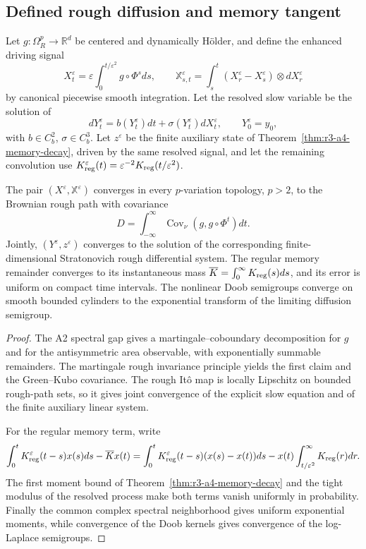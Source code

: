 \subsection{Defined rough diffusion and memory tangent}

Let \(g:\Omega_R^p\to\mathbb R^d\) be centered and dynamically H\"older, and
define the enhanced driving signal
\[
 X_t^\varepsilon
 =\varepsilon\int_0^{t/\varepsilon^2}g\circ\Phi^sds,
 \qquad
 \mathbb X_{s,t}^\varepsilon
 =\int_s^t(X_r^\varepsilon-X_s^\varepsilon)
 \otimes dX_r^\varepsilon
\]
by canonical piecewise smooth integration.  Let the resolved slow variable be
the solution of
\[
 dY_t^\varepsilon=b(Y_t^\varepsilon)dt+
 \sigma(Y_t^\varepsilon)dX_t^\varepsilon,
 \qquad Y_0^\varepsilon=y_0,
\]
with \(b\in C_b^2\), \(\sigma\in C_b^3\).  Let \(z^\varepsilon\) be the
finite auxiliary state of Theorem~\ref{thm:r3-a4-memory-decay}, driven by the
same resolved signal, and let the remaining convolution use
\(K_{\rm reg}^\varepsilon(t)=\varepsilon^{-2}K_{\rm reg}(t/\varepsilon^2)\).

\begin{theorem}
\label{thm:r3-a4-tangent}
The pair \((X^\varepsilon,\mathbb X^\varepsilon)\) converges in every
\(p\)-variation topology, \(p>2\), to the Brownian rough path with covariance
\[
 D=\int_{-\infty}^{\infty}
 \operatorname{Cov}_\nu(g,g\circ\Phi^t)dt.
\]
Jointly, \((Y^\varepsilon,z^\varepsilon)\) converges to the solution of the
corresponding finite-dimensional Stratonovich rough differential system.  The
regular memory remainder converges to its instantaneous mass
\(\overline K=\int_0^\infty K_{\rm reg}(s)ds\), and its error is uniform on
compact time intervals.  The nonlinear Doob semigroups converge on smooth
bounded cylinders to the exponential transform of the limiting diffusion
semigroup.
\end{theorem}

\begin{proof}
The A2 spectral gap gives a martingale--coboundary decomposition for \(g\) and
for the antisymmetric area observable, with exponentially summable
remainders.  The martingale rough invariance principle yields the first
claim and the Green--Kubo covariance.  The rough It\^o map is locally
Lipschitz on bounded rough-path sets, so it gives joint convergence of the
explicit slow equation and of the finite auxiliary linear system.

For the regular memory term, write
\[
 \int_0^tK_{\rm reg}^\varepsilon(t-s)x(s)ds-
 \overline Kx(t)
 =\int_0^tK_{\rm reg}^\varepsilon(t-s)(x(s)-x(t))ds
 -x(t)\int_{t/\varepsilon^2}^\infty K_{\rm reg}(r)dr.
\]
The first moment bound of Theorem~\ref{thm:r3-a4-memory-decay} and the tight
modulus of the resolved process make both terms vanish uniformly in
probability.  Finally the common complex spectral neighborhood gives uniform
exponential moments, while convergence of the Doob kernels gives convergence
of the log-Laplace semigroups.
\end{proof}
